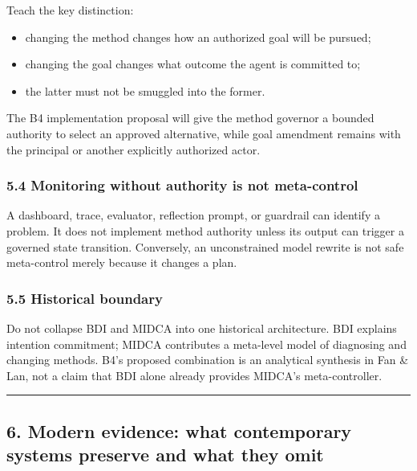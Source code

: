 Teach the key distinction:

\begin{itemize}
\tightlist
\item
  changing the method changes how an authorized goal will be pursued;
\item
  changing the goal changes what outcome the agent is committed to;
\item
  the latter must not be smuggled into the former.
\end{itemize}

The B4 implementation proposal will give the method governor a bounded authority to select an approved alternative, while goal amendment remains with the principal or another explicitly authorized actor.

\subsubsection{5.4 Monitoring without authority is not meta-control}\label{monitoring-without-authority-is-not-meta-control}

A dashboard, trace, evaluator, reflection prompt, or guardrail can identify a problem. It does not implement method authority unless its output can trigger a governed state transition. Conversely, an unconstrained model rewrite is not safe meta-control merely because it changes a plan.

\subsubsection{5.5 Historical boundary}\label{historical-boundary-1}

Do not collapse BDI and MIDCA into one historical architecture. BDI explains intention commitment; MIDCA contributes a meta-level model of diagnosing and changing methods. B4's proposed combination is an analytical synthesis in Fan \& Lan, not a claim that BDI alone already provides MIDCA's meta-controller.\autocite{cox2016midca}

\begin{center}\rule{0.5\linewidth}{0.5pt}\end{center}

\subsection{6. Modern evidence: what contemporary systems preserve and what they omit}\label{modern-evidence-what-contemporary-systems-preserve-and-what-they-omit}

